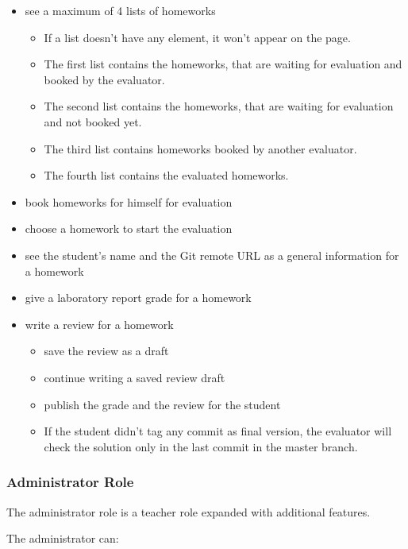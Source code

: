 \begin{itemize}
	\item see a maximum of 4 lists of homeworks
	\begin{itemize}
		\item If a list doesn't have any element, it won't appear on the page.
		\item The first list contains the homeworks, that are waiting for evaluation and booked by the evaluator. 
		\item The second list contains the homeworks, that are waiting for evaluation and not booked yet. 
		\item The third list contains homeworks booked by another evaluator. 
		\item The fourth list contains the evaluated homeworks. 
	\end{itemize}
	\item book homeworks for himself for evaluation
	\item choose a homework to start the evaluation
	\item see the student's name and the Git remote URL as a general information for a homework
	\item give a laboratory report grade for a homework
	\item write a review for a homework
		\begin{itemize}
			\item save the review as a draft
			\item continue writing a saved review draft
			\item publish the grade and the review for the student
			\item If the student didn't tag any commit as final version, the evaluator will check the solution only in the last commit in the master branch.
		\end{itemize}
\end{itemize}

\subsubsection{Administrator Role}

The administrator role is a teacher role expanded with additional features.

The administrator can:

